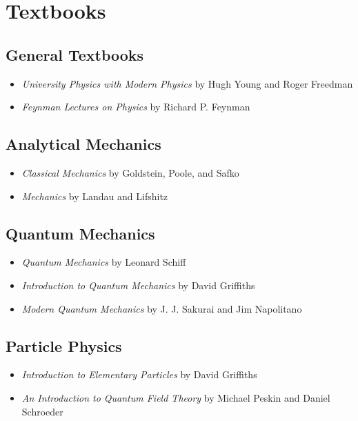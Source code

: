 \newpage
\section{Textbooks}
\subsection{General Textbooks}
\begin{itemize}
  \item \emph{University Physics with Modern Physics} by Hugh Young and Roger Freedman \cite{young-freedman}
  \item \emph{Feynman Lectures on Physics} by Richard P. Feynman \cite{feynman-lectures-online}
\end{itemize}

\subsection{Analytical Mechanics}
\begin{itemize}
  \item \emph{Classical Mechanics} by Goldstein, Poole, and Safko \cite{goldstein-classical}
  \item \emph{Mechanics} by Landau and Lifshitz \cite{landau-mechanics}
\end{itemize}

\subsection{Quantum Mechanics}
\begin{itemize}
  \item \emph{Quantum Mechanics} by Leonard Schiff \cite{schiff}
  \item \emph{Introduction to Quantum Mechanics} by David Griffiths \cite{griffiths-qm}
  \item \emph{Modern Quantum Mechanics} by J. J. Sakurai and Jim Napolitano \cite{jjsakurai-qm}
\end{itemize}


\subsection{Particle Physics}
\begin{itemize}
  \item \emph{Introduction to Elementary Particles} by David Griffiths \cite{griffith-introToEP}
  \item \emph{An Introduction to Quantum Field Theory} by Michael Peskin and Daniel Schroeder \cite{peskin-introToQFT}
\end{itemize}